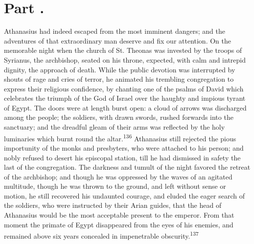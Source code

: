 


\section{Part \thesection.}

Athanasius had indeed escaped from the most imminent dangers; and
the adventures of that extraordinary man deserve and fix our
attention. On the memorable night when the church of St. Theonas
was invested by the troops of Syrianus, the archbishop, seated on
his throne, expected, with calm and intrepid dignity, the
approach of death. While the public devotion was interrupted by
shouts of rage and cries of terror, he animated his trembling
congregation to express their religious confidence, by chanting
one of the psalms of David which celebrates the triumph of the
God of Israel over the haughty and impious tyrant of Egypt. The
doors were at length burst open: a cloud of arrows was discharged
among the people; the soldiers, with drawn swords, rushed
forwards into the sanctuary; and the dreadful gleam of their arms
was reflected by the holy luminaries which burnt round the altar.\textsuperscript{136}
Athanasius still rejected the pious importunity of the monks
and presbyters, who were attached to his person; and nobly
refused to desert his episcopal station, till he had dismissed in
safety the last of the congregation. The darkness and tumult of
the night favored the retreat of the archbishop; and though he
was oppressed by the waves of an agitated multitude, though he
was thrown to the ground, and left without sense or motion, he
still recovered his undaunted courage, and eluded the eager
search of the soldiers, who were instructed by their Arian
guides, that the head of Athanasius would be the most acceptable
present to the emperor. From that moment the primate of Egypt
disappeared from the eyes of his enemies, and remained above six
years concealed in impenetrable obscurity.\textsuperscript{137}

